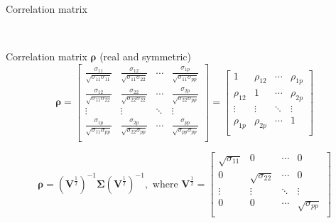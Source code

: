 \documentclass[ignorenonframetext,]{beamer}
\begin{document}
\begin{frame}

\begin{block}{Correlation matrix}

\(~\)

Correlation matrix \(\boldsymbol{\rho}\) (real and symmetric)
\[\boldsymbol{\rho}=\left[ \begin{array}{cccc}
    \frac{\sigma_{11}}{\sqrt{\sigma_{11}\sigma_{11}}} &
    \frac{\sigma_{12}}{\sqrt{\sigma_{11}\sigma_{22}}} &
    \cdots &
    \frac{\sigma_{1p}}{\sqrt{\sigma_{11}\sigma_{pp}}}\\
    \frac{\sigma_{12}}{\sqrt{\sigma_{11}\sigma_{22}}} &
    \frac{\sigma_{22}}{\sqrt{\sigma_{22}\sigma_{22}}} &
    \cdots &
    \frac{\sigma_{2p}}{\sqrt{\sigma_{22}\sigma_{pp}}}\\
    \vdots & \vdots & \ddots & \vdots\\
      \frac{\sigma_{1p}}{\sqrt{\sigma_{11}\sigma_{pp}}} &
    \frac{\sigma_{2p}}{\sqrt{\sigma_{22}\sigma_{pp}}} &
    \cdots &
    \frac{\sigma_{pp}}{\sqrt{\sigma_{pp}\sigma_{pp}}}\\ \end{array}\right]=
 \left[ \begin{array}{cccc}
    1 & \rho_{12} & \cdots & \rho_{1p}\\
    \rho_{12} & 1 & \cdots & \rho_{2p}\\
    \vdots & \vdots & \ddots & \vdots\\
    \rho_{1p} & \rho_{2p} & \cdots & 1\\
\end{array}\right]\]

\[\boldsymbol{\rho}=(\boldsymbol{V}^{\frac{1}{2}})^{-1}
    \boldsymbol\Sigma(\boldsymbol{V}^{\frac{1}{2}})^{-1}, \text{   where    }
   \boldsymbol{V}^{\frac{1}{2}}=
 \left[ \begin{array}{cccc}
    \sqrt{\sigma_{11}} & 0& \cdots & 0\\
    0 & \sqrt{\sigma_{22}} & \cdots & 0\\
    \vdots & \vdots & \ddots & \vdots\\
    0 & 0 & \cdots & \sqrt{\sigma_{pp}}\\
\end{array} \right]\]

\end{block}

\end{frame}
\end{document}
